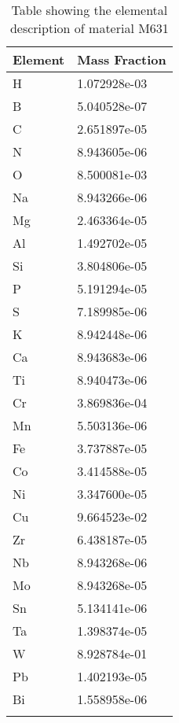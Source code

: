 \begin{centering}
\begin{longtable}[ht!]
{ p{} | p{} }
\hline
Element & Mass Fraction\\
\hline
H &  1.072928e-03\\
B &  5.040528e-07\\
C &  2.651897e-05\\
N &  8.943605e-06\\
O &  8.500081e-03\\
Na &  8.943266e-06\\
Mg &  2.463364e-05\\
Al &  1.492702e-05\\
Si &  3.804806e-05\\
P &  5.191294e-05\\
S &  7.189985e-06\\
K &  8.942448e-06\\
Ca &  8.943683e-06\\
Ti &  8.940473e-06\\
Cr &  3.869836e-04\\
Mn &  5.503136e-06\\
Fe &  3.737887e-05\\
Co &  3.414588e-05\\
Ni &  3.347600e-05\\
Cu &  9.664523e-02\\
Zr &  6.438187e-05\\
Nb &  8.943268e-06\\
Mo &  8.943268e-05\\
Sn &  5.134141e-06\\
Ta &  1.398374e-05\\
W &  8.928784e-01\\
Pb &  1.402193e-05\\
Bi &  1.558958e-06\\
\caption{Table showing the elemental description of material M631}
\label{table:material_M631}
\end{longtable}
\clearpage


\end{centering}
